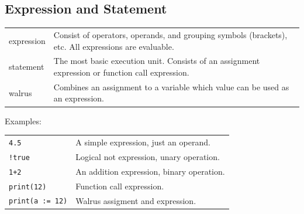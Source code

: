\subsection*{Expression and Statement}
\begin{tabular}{@{}lp{}}
    \textsf{expression} & Consist of operators, operands, and grouping symbols (brackets), etc. All expressions are evaluable. \\
    \textsf{statement} & The most basic execution unit. Consists of an assignment expression or function call expression. \\
    \textsf{walrus} & Combines an assignment to a variable which value can be used as an expression.\\
\end{tabular}

\hangpar Examples:\\
\begin{tabular}{@{}ll}
    \texttt{4.5} & A simple expression, just an operand. \\
    \texttt{!true} & Logical not expression, unary operation. \\
    \texttt{1+2} & An addition expression, binary operation. \\
    \texttt{print(12)} & Function call expression. \\
    \texttt{print(a := 12)} & Walrus assigment and expression. \\
\end{tabular}

